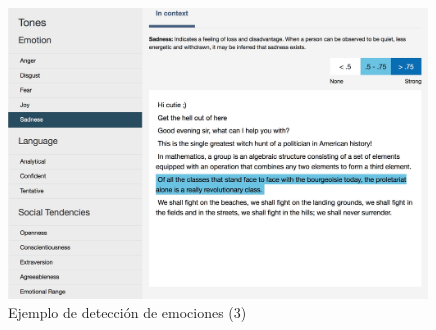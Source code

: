 \documentclass[compress]{beamer}
\begin{document}
\begin{frame}
	\begin{figure}[H]
		\centering
		\label{sadness.jpg}
		\includegraphics[width=0.99\textwidth]{./Imagenes/sadness.jpeg}
		\caption{Ejemplo de detección de emociones (3)}
	\end{figure}
\end{frame}
\end{document}
